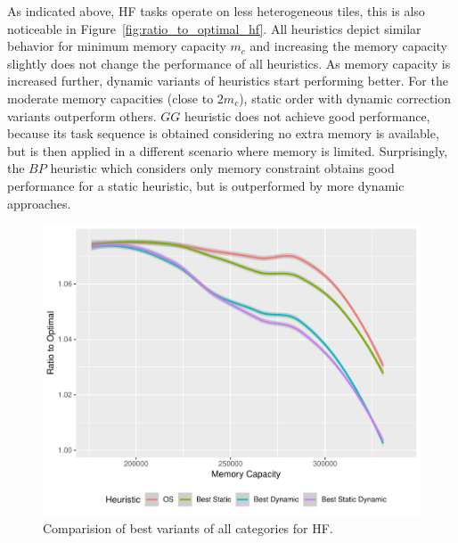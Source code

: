 \documentclass[sigconf]{acmart}
\begin{document}
{		As indicated above, HF tasks operate on less heterogeneous tiles, this is also noticeable in Figure~\ref{fig:ratio_to_optimal_hf}. All heuristics depict similar behavior for minimum memory capacity $m_c$ and increasing the memory capacity slightly does not change the performance of all heuristics. As memory capacity is increased further, dynamic variants of heuristics start performing better. For the moderate memory capacities (close to $2m_c$), static order with dynamic correction variants outperform others. $GG$ heuristic does not achieve good performance, because its task sequence is obtained considering no extra memory is available, but is then applied in a different scenario where memory is limited. Surprisingly, the $BP$ heuristic which considers only memory constraint obtains good performance for a static heuristic, but is outperformed by more dynamic approaches.
		
		\begin{figure}[htb]
			\includegraphics[scale=0.5]{./results/plots/ratio_to_optimal_hf-best.pdf}
			\caption{Comparision of best variants of all categories for HF.}
			\label{fig:ratio_to_optimal_best_hf}
		\end{figure}
		
}
\end{document}
